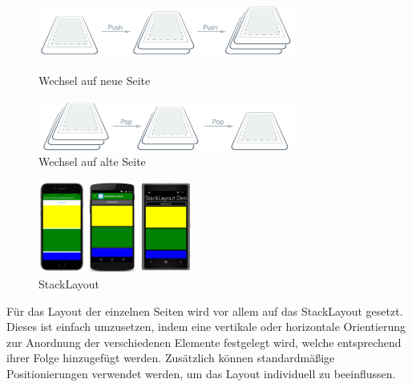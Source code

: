 \begin{figure}[h]
	\begin{center}
		\includegraphics[width=0.75\textwidth]{images/implementation/push.png}
	\end{center}	
	\caption{Wechsel auf neue Seite \cite{Xamarin.HierarchicalNavigation}}
	\label{fig:push}
	\begin{center}
		\includegraphics[width=0.75\textwidth]{images/implementation/pop.png}
	\end{center}	
	\caption{Wechsel auf alte Seite \cite{Xamarin.HierarchicalNavigation}}
	\label{fig:pop}
\end{figure}

\bigskip

\begin{figure}
	\begin{center}
		\vspace{-1cm}
		\includegraphics[width=0.45\textwidth]{images/implementation/stacklayout.png}
	\end{center}
	\caption{StackLayout \cite{Xamarin.StackLayoutXamarin}}
	\label{fig:stacklayout}
\end{figure}

\noindent
Für das Layout der einzelnen Seiten wird vor allem auf das StackLayout gesetzt. Dieses ist einfach umzusetzen, indem eine vertikale oder horizontale Orientierung zur Anordnung der verschiedenen Elemente festgelegt wird, welche entsprechend ihrer Folge hinzugefügt werden. Zusätzlich können standardmäßige Positionierungen verwendet werden, um das Layout individuell zu beeinflussen.

\begin{verbatim}
\end{verbatim}
\newpage
